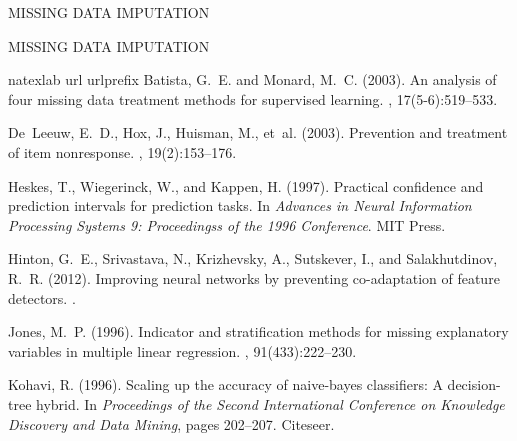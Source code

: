 \documentclass[10pt]{book}
\theoremstyle{definition}
\begin{document}
{\hfill {\footnotesize\rm MISSING DATA IMPUTATION} \hfill}

\bibhang=1.7pc
\bibsep=2pt
\fontsize{9}{14pt plus.8pt minus .6pt}\selectfont
\renewcommand\bibname{\large \bf References} 
\clearpage
{}
{\hfill {\footnotesize\rm MISSING DATA IMPUTATION} \hfill}
\begin{thebibliography}{11}
\expandafter\ifx\csname
natexlab\endcsname\relax\def\natexlab#1{#1}\fi
\expandafter\ifx\csname url\endcsname\relax
  \def\url#1{\texttt{#1}}\fi
\expandafter\ifx\csname urlprefix\endcsname\relax\def\urlprefix{URL
}\fi
{}
Batista, G.~E. and Monard, M.~C. (2003).
\newblock An analysis of four missing data treatment methods for supervised
  learning.
, 17(5-6):519--533.

De~Leeuw, E.~D., Hox, J., Huisman, M., et~al. (2003).
\newblock Prevention and treatment of item nonresponse.
, 19(2):153--176.

Heskes, T., Wiegerinck, W., and Kappen, H. (1997).
\newblock Practical confidence and prediction intervals for prediction tasks.
\newblock In {\em Advances in Neural Information Processing Systems 9:
  Proceedingss of the 1996 Conference}. MIT Press.

Hinton, G.~E., Srivastava, N., Krizhevsky, A., Sutskever, I., and
  Salakhutdinov, R.~R. (2012).
\newblock Improving neural networks by preventing co-adaptation of feature
  detectors.
.

Jones, M.~P. (1996).
\newblock Indicator and stratification methods for missing explanatory
  variables in multiple linear regression.
,
  91(433):222--230.

Kohavi, R. (1996).
\newblock Scaling up the accuracy of naive-bayes classifiers: A decision-tree
  hybrid.
\newblock In {\em Proceedings of the Second International Conference on
  Knowledge Discovery and Data Mining}, pages 202--207. Citeseer.


\end{thebibliography}
\end{document}

